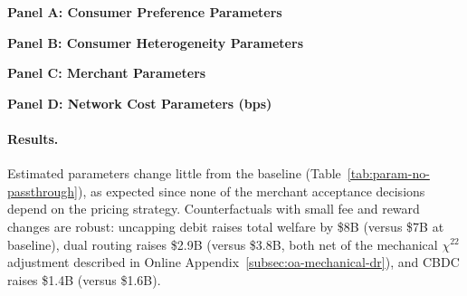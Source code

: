 \documentclass[main.tex]{subfiles}
\begin{document}
\begin{table}[ht!]
    \small
    \caption{Estimated parameters: No merchant fee pass-through}
    \label{tab:param-no-passthrough}
\begin{center}\setlength{\tabcolsep}{4pt} \begin{minipage}[t]{0.5\columnwidth}%
\centering \textbf{Panel A: Consumer Preference Parameters} \par\medskip 
\end{minipage}%
\begin{minipage}[t]{0.5\columnwidth}%
\centering \textbf{Panel B: Consumer Heterogeneity Parameters} \par\medskip 
\end{minipage}

\vspace{0.5em}

\begin{minipage}[t]{0.5\columnwidth}%
\centering \textbf{Panel C: Merchant Parameters} \par\medskip 
\end{minipage}%
\begin{minipage}[t]{0.5\columnwidth}%
\centering \textbf{Panel D: Network Cost Parameters (bps)} \par\medskip 
\end{minipage}
\end{center}
\end{table}

\paragraph{Results.} Estimated parameters change little from the baseline (Table~\ref{tab:param-no-passthrough}), as expected since none of the merchant acceptance decisions depend on the pricing strategy.
Counterfactuals with small fee and reward changes are robust: uncapping debit raises total welfare by \$8B (versus \$7B at baseline), dual routing raises \$2.9B (versus \$3.8B, both net of the mechanical $\chi^{22}$ adjustment described in Online Appendix~\ref{subsec:oa-mechanical-dr}), and CBDC raises \$1.4B (versus \$1.6B).
\end{document}
